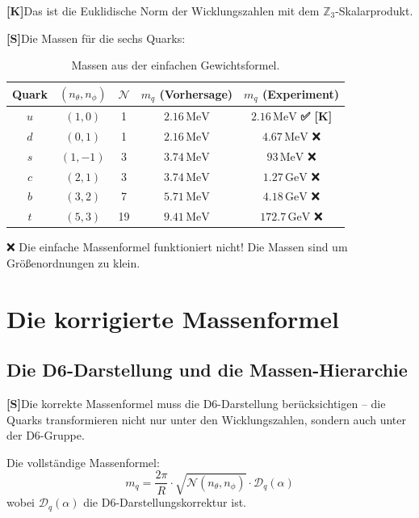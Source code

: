 \documentclass[11pt,a4paper]{article}
\newcommand{\Kstatus}{\textbf{[K]}}
\newcommand{\Sstatus}{\textbf{[S]}}
\newcommand{\Checkmark}{\textbf{✅ [K]}}
\begin{document}
	\Kstatus Das ist die Euklidische Norm der Wicklungszahlen mit dem $\mathbb{Z}_3$-Skalarprodukt.
	
	\Sstatus Die Massen für die sechs Quarks:
	
	\begin{table}[h!]
		\centering
		\caption{Massen aus der einfachen Gewichtsformel.}
		\label{tab:simple_masses}
		\begin{tabular}{c c c c c}
			\toprule
			\textbf{Quark} & $(n_\theta, n_\phi)$ & $\mathcal{N}$ & $m_q$ (Vorhersage) & $m_q$ (Experiment) \\
			\midrule
			$u$ & $(1, 0)$ & 1 & $2.16\,\text{MeV}$ & $2.16\,\text{MeV}$ \Checkmark \\
			$d$ & $(0, 1)$ & 1 & $2.16\,\text{MeV}$ & $4.67\,\text{MeV}$ ❌ \\
			$s$ & $(1, -1)$ & 3 & $3.74\,\text{MeV}$ & $93\,\text{MeV}$ ❌ \\
			$c$ & $(2, 1)$ & 3 & $3.74\,\text{MeV}$ & $1.27\,\text{GeV}$ ❌ \\
			$b$ & $(3, 2)$ & 7 & $5.71\,\text{MeV}$ & $4.18\,\text{GeV}$ ❌ \\
			$t$ & $(5, 3)$ & 19 & $9.41\,\text{MeV}$ & $172.7\,\text{GeV}$ ❌ \\
			\bottomrule
		\end{tabular}
	\end{table}
	
	❌ Die einfache Massenformel funktioniert nicht! Die Massen sind um Größenordnungen zu klein.
	
	\section{Die korrigierte Massenformel}
	
	\subsection{Die D6-Darstellung und die Massen-Hierarchie}
	
	\Sstatus Die korrekte Massenformel muss die D6-Darstellung berücksichtigen -- die Quarks transformieren nicht nur unter den Wicklungszahlen, sondern auch unter der D6-Gruppe.
	
	Die vollständige Massenformel:
	\begin{equation}
		m_q = \frac{2\pi}{R} \cdot \sqrt{\mathcal{N}(n_\theta, n_\phi)} \cdot \mathcal{D}_q(\alpha)
	\end{equation}
	wobei $\mathcal{D}_q(\alpha)$ die D6-Darstellungskorrektur ist.
	
\end{document}
